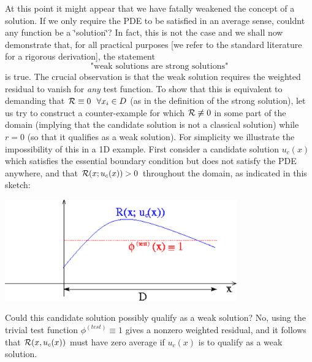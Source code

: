 At this point it might appear that we have fatally weakened the concept of a solution. If we only require the P\+DE to be satisfied in an average sense, couldn\textquotesingle{}t any function be a \char`\"{}solution\char`\"{}? In fact, this is not the case and we shall now demonstrate that, for all practical purposes \mbox{[}we refer to the standard literature for a rigorous derivation\mbox{]}, the statement \[ \mbox{ "weak solutions are strong solutions" } \] is true. The crucial observation is that the weak solution requires the weighted residual to vanish for {\itshape any} test function. To show that this is equivalent to demanding that $ {\cal R} \equiv 0 \ \ \forall x_i \in D $ (as in the definition of the strong solution), let us try to construct a counter-\/example for which $ {\cal R} \not\equiv 0 $ in some part of the domain (implying that the candidate solution is not a classical solution) while $r=0$ (so that it qualifies as a weak solution). For simplicity we illustrate the impossibility of this in a 1D example. First consider a candidate solution $ u_c(x)$ which satisfies the essential boundary condition but does not satisfy the P\+DE anywhere, and that $ {\cal R}(x; u_c(x)) > 0 $ throughout the domain, as indicated in this sketch\+:  
\begin{DoxyImage}
\includegraphics[width=0.75\textwidth]{weaksoln1}
\end{DoxyImage}
 Could this candidate solution possibly qualify as a weak solution? No, using the trivial test function $ \phi^{(test)} \equiv 1 $ gives a nonzero weighted residual, and it follows that $ {\cal R}(x, u_c(x)) $ must have zero average if $ u_c(x) $ is to qualify as a weak solution.

